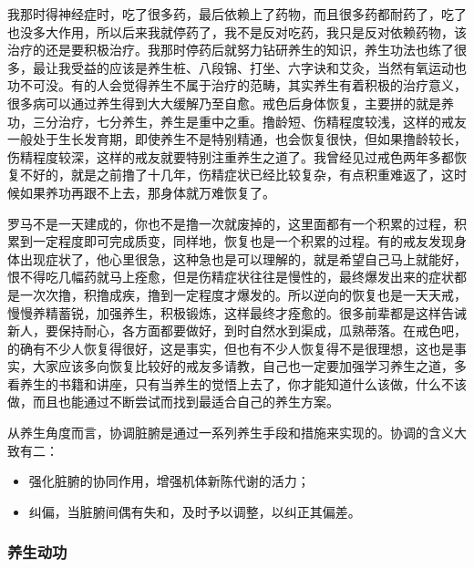 我那时得神经症时，吃了很多药，最后依赖上了药物，而且很多药都耐药了，吃了也没多大作用，所以后来我就停药了，我不是反对吃药，我只是反对依赖药物，该治疗的还是要积极治疗。我那时停药后就努力钻研养生的知识，养生功法也练了很多，最让我受益的应该是养生桩、八段锦、打坐、六字诀和艾灸，当然有氧运动也功不可没。有的人会觉得养生不属于治疗的范畴，其实养生有着积极的治疗意义，很多病可以通过养生得到大大缓解乃至自愈。戒色后身体恢复，主要拼的就是养功，三分治疗，七分养生，养生是重中之重。撸龄短、伤精程度较浅，这样的戒友一般处于生长发育期，即使养生不是特别精通，也会恢复很快，但如果撸龄较长，伤精程度较深，这样的戒友就要特别注重养生之道了。我曾经见过戒色两年多都恢复不好的，就是之前撸了十几年，伤精症状已经比较复杂，有点积重难返了，这时候如果养功再跟不上去，那身体就万难恢复了。

罗马不是一天建成的，你也不是撸一次就废掉的，这里面都有一个积累的过程，积累到一定程度即可完成质变，同样地，恢复也是一个积累的过程。有的戒友发现身体出现症状了，他心里很急，这种急也是可以理解的，就是希望自己马上就能好，恨不得吃几幅药就马上痊愈，但是伤精症状往往是慢性的，最终爆发出来的症状都是一次次撸，积撸成疾，撸到一定程度才爆发的。所以逆向的恢复也是一天天戒，慢慢养精蓄锐，加强养生，积极锻炼，这样最终才痊愈的。很多前辈都是这样告诫新人，要保持耐心，各方面都要做好，到时自然水到渠成，瓜熟蒂落。在戒色吧，的确有不少人恢复得很好，这是事实，但也有不少人恢复得不是很理想，这也是事实，大家应该多向恢复比较好的戒友多请教，自己也一定要加强学习养生之道，多看养生的书籍和讲座，只有当养生的觉悟上去了，你才能知道什么该做，什么不该做，而且也能通过不断尝试而找到最适合自己的养生方案。

从养生角度而言，协调脏腑是通过一系列养生手段和措施来实现的。协调的含义大致有二：

\begin{itemize}
    \item 强化脏腑的协同作用，增强机体新陈代谢的活力；
    \item 纠偏，当脏腑间偶有失和，及时予以调整，以纠正其偏差。
\end{itemize}

\subsubsection{养生动功}

